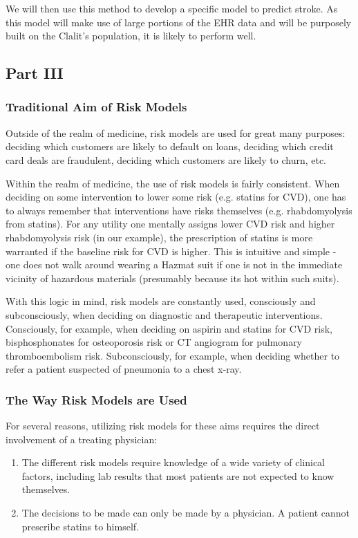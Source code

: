 \documentclass[a4paper,12pt]{article}
\begin{document}
			We will then use this method to develop a specific model to predict stroke. As this model will make use of large portions of the EHR data and will be purposely built on the Clalit's population, it is likely to perform well.
		
		\subsection{Part III}
		
			\subsubsection{Traditional Aim of Risk Models}
			
			Outside of the realm of medicine, risk models are used for great many purposes: deciding which customers are likely to default on loans, deciding which credit card deals are fraudulent, deciding which customers are likely to churn, etc.
			
			Within the realm of medicine, the use of risk models is fairly consistent. When deciding on some intervention to lower some risk (e.g. statins for CVD), one has to always remember that interventions have risks themselves (e.g. rhabdomyolysis from statins). For any utility one mentally assigns lower CVD risk and higher rhabdomyolysis risk (in our example), the prescription of statins is more warranted if the baseline risk for CVD is higher. This is intuitive and simple - one does not walk around wearing a Hazmat suit if one is not in the immediate vicinity of hazardous materials (presumably because its hot within such suits).
			
			With this logic in mind, risk models are constantly used, consciously and subconsciously, when deciding on diagnostic and therapeutic interventions. Consciously, for example, when deciding on aspirin and statins for CVD risk\cite{Goff2014,Bibbins-Domingo2016}, bisphosphonates for osteoporosis risk \cite{Jeremiah2015} or CT angiogram for pulmonary thromboembolism risk\cite{Wells2001}. Subconsciously, for example, when deciding whether to refer a patient suspected of pneumonia to a chest x-ray.
			
			\subsubsection{The Way Risk Models are Used}
			
			For several reasons, utilizing risk models for these aims requires the direct involvement of a treating physician:
			\begin{enumerate}
				\item The different risk models require knowledge of a wide variety of clinical factors, including lab results that most patients are not expected to know themselves.
				\item The decisions to be made can only be made by a physician. A patient cannot prescribe statins to himself.
			\end{enumerate}
			
\end{document}
